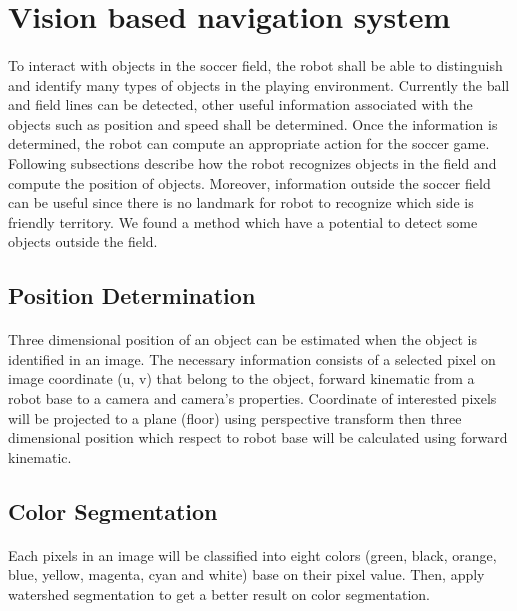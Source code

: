 \section{Vision based navigation system}
\paragraph{}
To interact with objects in the soccer field, the robot shall be able to distinguish and identify many types of objects in the playing environment. Currently the ball and field lines can be detected, other useful information associated with the objects such as position and speed shall be determined. Once the information is determined, the robot can compute an appropriate action for the soccer game. Following subsections describe how the robot recognizes objects in the field and compute the position of objects. Moreover, information outside the soccer field can be useful since there is no landmark for robot to recognize which side is friendly territory. We found a method which have a potential to detect some objects outside the field.

	\subsection{Position Determination}
	\label{threeToTwo}
	\paragraph{}
	Three dimensional position of an object can be estimated when the object is identified in an image. The necessary information consists of a selected pixel on image coordinate (u, v) that belong to the object, forward kinematic from a robot base to a camera and camera's properties. Coordinate of interested pixels will be projected to a plane (floor) using perspective transform then three dimensional position which respect to robot base will be calculated using forward kinematic.
	
	\subsection{Color Segmentation}
	\label{colorSeg}
	\paragraph{}
	Each pixels in an image will be classified into eight colors (green, black, orange, blue, yellow, magenta, cyan and white) base on their pixel value. Then, apply watershed segmentation to get a better result on color segmentation.
